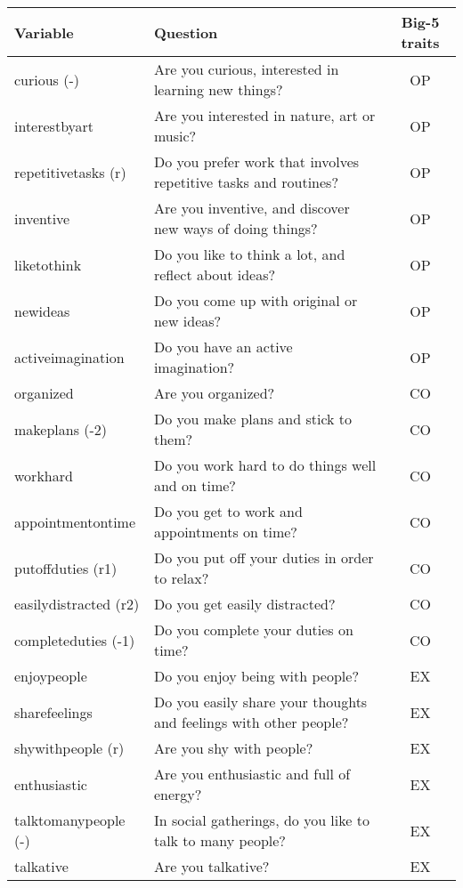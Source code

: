 \begin{table}[htbp]
  \centering
  \begin{adjustbox}{max width=\textwidth}
    \begin{tabular}{llc}
    \toprule
    Variable & Question & Big-5 traits  \\
    \midrule
    curious (-) & Are you curious, interested in learning new things? & OP     \\
    interestbyart & Are you interested in nature, art or music? & OP     \\
    repetitivetasks (r) & Do you prefer work that involves repetitive tasks and routines? & OP    \\
    inventive & Are you inventive, and discover new ways of doing things? & OP    \\
    liketothink & Do you like to think a lot, and reflect about ideas? & OP    \\
    newideas & Do you come up with original or new ideas? & OP  \\
    activeimagination & Do you have an active imagination? & OP   \\
	\midrule
    organized & Are you organized? & CO   \\
    makeplans (-2) & Do you make plans and stick to them? & CO \\
    workhard & Do you work hard to do things well and on time? & CO    \\
    appointmentontime & Do you get to work and appointments on time? & CO   \\
    putoffduties (r1) & Do you put off your duties in order to relax? & CO   \\
    easilydistracted (r2) & Do you get easily distracted? & CO   \\
    completeduties (-1) & Do you complete your duties on time? & CO   \\
	\midrule
    enjoypeople & Do you enjoy being with people? & EX  \\
    sharefeelings & Do you easily share your thoughts and feelings with other people? & EX  \\
    shywithpeople (r) & Are you shy with people? & EX   \\
    enthusiastic & Are you enthusiastic and full of energy? & EX   \\
    talktomanypeople (-) & In social gatherings, do you like to talk to many people? & EX   \\
    talkative & Are you talkative? & EX  \\

\end{tabular}
\end{adjustbox}
\end{table}
